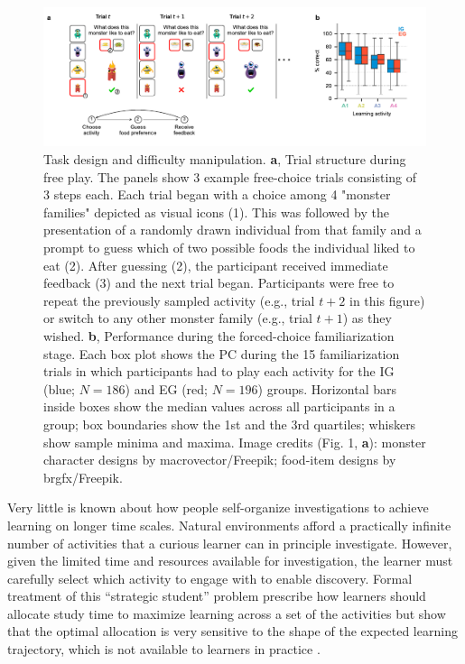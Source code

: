 \begin{figure}[tbh]
    \centering
    \includegraphics[width=\textwidth]{Figures/c4/figure1.pdf}
    \caption[(\textbf{a}) Free-exploration paradigm; (\textbf{b}) Problem difficulty and initial performance]{Task design and difficulty manipulation. \textbf{a}, Trial structure during free play. The panels show 3 example free-choice trials consisting of 3 steps each. Each trial began with a choice among 4 "monster families" depicted as visual icons (1). This was followed by the presentation of a randomly drawn individual from that family and a prompt to guess which of two possible foods the individual liked to eat (2). After guessing (2), the participant received immediate feedback (3) and the next trial began. Participants were free to repeat the previously sampled activity (e.g., trial $t+2$ in this figure) or switch to any other monster family (e.g., trial $t+1$) as they wished. \textbf{b}, Performance during the forced-choice familiarization stage. Each box plot shows the \acf{PC} during the 15 familiarization trials in which participants had to play each activity for the \ac{IG} (blue; $N=186$) and \ac{EG} (red; $N=196$) groups. Horizontal bars inside boxes show the median values across all participants in a group; box boundaries show the 1st and the 3rd quartiles; whiskers show sample minima and maxima. Image credits (Fig. 1, \textbf{a}): monster character designs by macrovector/Freepik; food-item designs by brgfx/Freepik.}
    \label{fig:CH4_1}
\end{figure}

Very little is known about how people self-organize investigations to achieve  learning on longer time scales. Natural environments afford a practically infinite number of activities that a curious learner can in principle investigate. However, given the limited time and resources available for investigation, the learner  must carefully select which activity to engage with to enable discovery. Formal treatment of this “strategic student” problem prescribe how learners should allocate study time to maximize learning across a set of the activities \parencite{son_metacognitive_2006,lopes_strategic_2012} but show that the optimal allocation is very sensitive to the shape of the expected learning trajectory, which is not available to learners in practice \parencite{son_metacognitive_2006}. 
 
